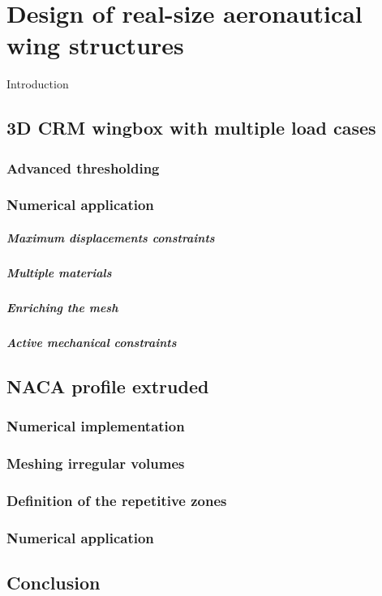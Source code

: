 \setchapterpreamble[u]{\margintoc}
\glsresetall %

\chapter{Design of real-size aeronautical wing structures}
Introduction
\section{3D CRM wingbox with multiple load cases}

\subsection{Advanced thresholding}

\subsection{Numerical application}

\paragraph{Maximum displacements constraints}

\paragraph{Multiple materials}

\paragraph{Enriching the mesh}

\paragraph{Active mechanical constraints}

\section{NACA profile extruded}

\subsection{Numerical implementation}

\subsection{Meshing irregular volumes}

\subsection{Definition of the repetitive zones}

\subsection{Numerical application}

\section{Conclusion}